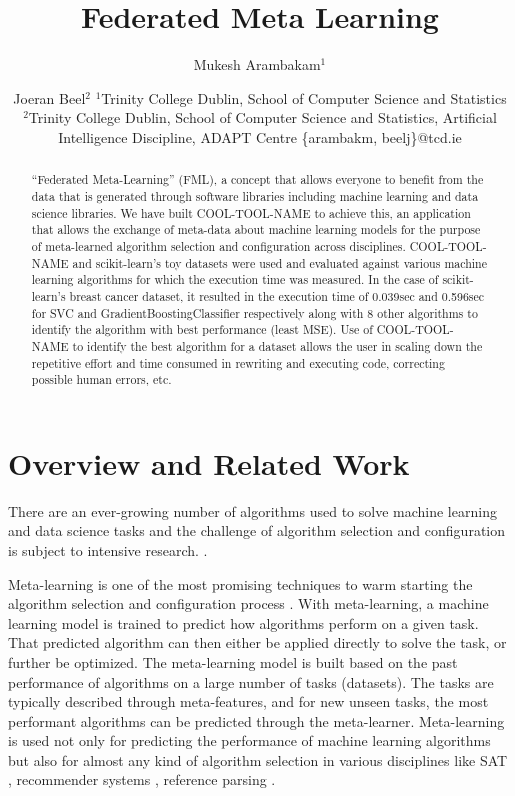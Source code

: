 \documentclass{article}
\title{Federated Meta Learning}
\author{
Mukesh Arambakam$^1$
\and
Joeran Beel$^2$
\affiliations
$^1$Trinity College Dublin,
School of Computer Science and Statistics\\
$^2$Trinity College Dublin,
School of Computer Science and Statistics,
Artificial Intelligence Discipline,
ADAPT Centre
\emails
\{arambakm, beelj\}@tcd.ie
}
\begin{document}
\maketitle

\begin{abstract}
“Federated Meta-Learning” (FML), a concept that allows everyone to benefit from the data that is generated through software libraries including machine learning and data science libraries. We have built COOL-TOOL-NAME to achieve this, an application that allows the exchange of meta-data about machine learning models for the purpose of meta-learned algorithm selection and configuration across disciplines.
COOL-TOOL-NAME and scikit-learn's toy datasets were used and evaluated against various machine learning algorithms for which the execution time was measured. In the case of scikit-learn’s breast cancer dataset, it resulted in the execution time of 0.039sec and 0.596sec for SVC and GradientBoostingClassifier respectively along with 8 other algorithms to identify the algorithm with best performance (least MSE). Use of COOL-TOOL-NAME to identify the best algorithm for a dataset allows the user in scaling down the repetitive effort and time consumed in rewriting and executing code, correcting possible human errors, etc.
\end{abstract}

\section{Overview and Related Work}
There are an ever-growing number of algorithms used to solve machine learning and data science tasks and the challenge of algorithm selection and configuration is subject to intensive research. \cite{bischl-et-al,brazdil:p,calandra-et-al,collins-et-al2018,cunha-et-al2017,edenhofer-et-al,ferrari-et-al,hutter-et-al,kotthoff:l,lindauer-et-al,romero-et-al,tu:w,vartak-et-al}.

Meta-learning is one of the most promising techniques to warm starting the algorithm selection and configuration process \cite{hutter-et-al}. With meta-learning, a machine learning model is trained to predict how algorithms perform on a given task. That predicted algorithm can then either be applied directly to solve the task, or further be optimized. The meta-learning model is built based on the past performance of algorithms on a large number of tasks (datasets). The tasks are typically described through meta-features, and for new unseen tasks, the most performant algorithms can be predicted through the meta-learner. Meta-learning is used not only for predicting the performance of machine learning algorithms but also for almost any kind of algorithm selection in various disciplines like SAT \cite{xu-et-al}, recommender systems \cite{collins-et-al2019,cunha-et-al2018}, reference parsing \cite{tkaczyk-et-al}.
\end{document}
